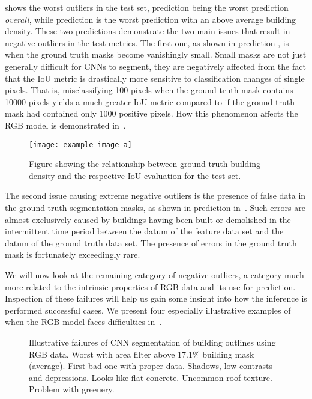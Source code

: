  shows the worst outliers in the test set, prediction  being the worst prediction \emph{overall}, while prediction  is the worst prediction with an above average building density. %
These two predictions demonstrate the two main issues that result in negative outliers in the test metrics.
The first one, as shown in prediction , is when the ground truth masks become vanishingly small.
Small masks are not just generally difficult for CNNs to segment, they are negatively affected from the fact that the IoU metric is drastically more sensitive to classification changes of single pixels.
That is, misclassifying 100 pixels when the ground truth mask contains \num{10000} pixels yields a much greater IoU metric compared to if the ground truth mask had contained only \num{1000} positive pixels.
How this phenomenon affects the RGB model is demonstrated in~.

\begin{figure}[H]
  \texttt{[image: example-image-a]}
  \caption{%
    Figure showing the relationship between ground truth building density and the respective IoU evaluation for the test set.
  }%
  \label{fig:rgb-density-relationship}
\end{figure}

The second issue causing extreme negative outliers is the presence of false data in the ground truth segmentation masks, as shown in prediction  in~.
Such errors are almost exclusively caused by buildings having been built or demolished in the intermittent time period between the datum of the feature data set and the datum of the ground truth data set.
The presence of errors in the ground truth mask is fortunately exceedingly rare.

We will now look at the remaining category of negative outliers, a category much more related to the intrinsic properties of RGB data and its use for prediction.
Inspection of these failures will help us gain some insight into how the inference is performed successful cases.
We present four especially illustrative examples of when the RGB model faces difficulties in~.

\begin{figure}[H]
  \centering
  \caption{%
    Illustrative failures of CNN segmentation of building outlines using RGB data.
    Worst with area filter above 17.1\% building mask (average).  First bad one with proper data.  Shadows, low contrasts and depressions.
    Looks like flat concrete.
    Uncommon roof texture.
    Problem with greenery.
  }%
  \label{fig:rgb-prediction-issues}
\end{figure}

